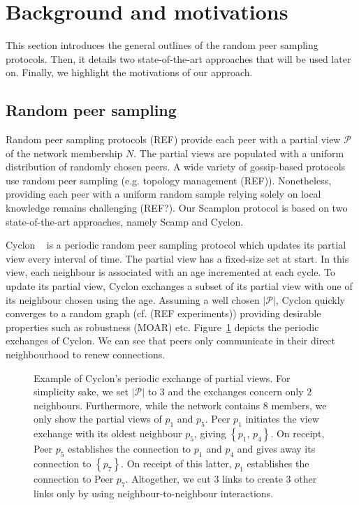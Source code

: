 
\section{Background and motivations}
\label{sec:background}

This section introduces the general outlines of the random peer sampling
protocols. Then, it details two state-of-the-art approaches that will be used
later on. Finally, we highlight the motivations of our approach.

\subsection{Random peer sampling}
Random peer sampling protocols (REF) provide each peer with a partial view
$\mathcal{P}$ of the network membership $N$. The partial views are populated
with a uniform distribution of randomly chosen peers. A wide variety of
gossip-based protocols use random peer sampling (e.g. topology management
(REF)). Nonetheless, providing each peer with a uniform random sample relying
solely on local knowledge remains challenging (REF?).  Our Scamplon protocol is
based on two state-of-the-art approaches, namely Scamp and Cyclon.

\begin{asparadesc}
\item [Cyclon]~\cite{voulgaris2005cyclon} is a periodic random peer sampling
  protocol which updates its partial view every interval of time. The partial
  view has a fixed-size set at start. In this view, each neighbour is
  associated with an age incremented at each cycle. To update its partial view,
  Cyclon exchanges a subset of its partial view with one of its neighbour
  chosen using the age.  Assuming a well chosen $|\mathcal{P}|$, Cyclon quickly
  converges to a random graph (cf. (REF experiments)) providing desirable
  properties such as robustness (MOAR) etc.  Figure~\ref{fig:cyclonexample}
  depicts the periodic exchanges of Cyclon. We can see that peers only
  communicate in their direct neighbourhood to renew connections.
\end{asparadesc}

\begin{figure}
  \centering
  
  \caption{\label{fig:cyclonexample}Example of Cyclon's periodic exchange of
    partial views. For simplicity sake, we set $|\mathcal{P}|$ to $3$ and the
    exchanges concern only $2$ neighbours. Furthermore, while the network
    contains $8$ members, we only show the partial views of $p_1$ and $p_5$.
    Peer $p_1$ initiates the view exchange with its oldest neighbour $p_5$,
    giving $\left\{p_1,\,p_4\right\}$. On receipt, Peer $p_5$ establishes the
    connection to $p_1$ and $p_4$ and gives away its connection to
    $\left\{p_7\right\}$.  On receipt of this latter, $p_1$ establishes the
    connection to Peer $p_7$. Altogether, we cut $3$ links to create $3$ other
    links only by using neighbour-to-neighbour interactions.}
\end{figure}

